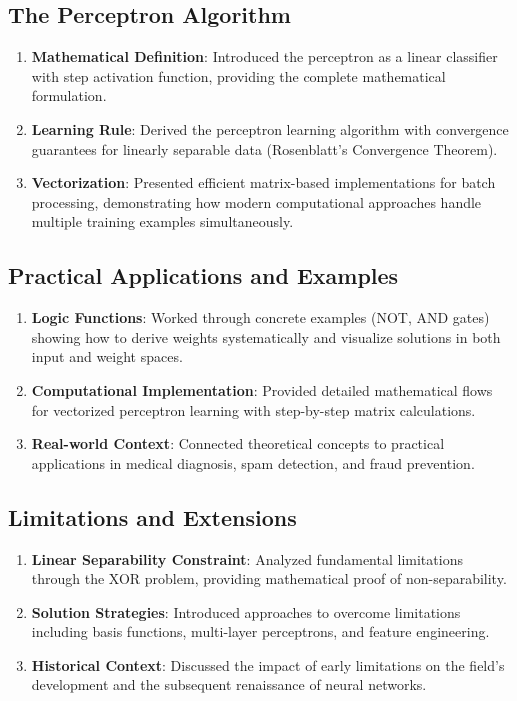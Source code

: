 \subsection{The Perceptron Algorithm}
\begin{enumerate}
    \item \textbf{Mathematical Definition}: Introduced the perceptron as a linear classifier with step activation function, providing the complete mathematical formulation.
    
    \item \textbf{Learning Rule}: Derived the perceptron learning algorithm with convergence guarantees for linearly separable data (Rosenblatt's Convergence Theorem).
    
    \item \textbf{Vectorization}: Presented efficient matrix-based implementations for batch processing, demonstrating how modern computational approaches handle multiple training examples simultaneously.
\end{enumerate}

\subsection{Practical Applications and Examples}
\begin{enumerate}
    \item \textbf{Logic Functions}: Worked through concrete examples (NOT, AND gates) showing how to derive weights systematically and visualize solutions in both input and weight spaces.
    
    \item \textbf{Computational Implementation}: Provided detailed mathematical flows for vectorized perceptron learning with step-by-step matrix calculations.
    
    \item \textbf{Real-world Context}: Connected theoretical concepts to practical applications in medical diagnosis, spam detection, and fraud prevention.
\end{enumerate}

\subsection{Limitations and Extensions}
\begin{enumerate}
    \item \textbf{Linear Separability Constraint}: Analyzed fundamental limitations through the XOR problem, providing mathematical proof of non-separability.
    
    \item \textbf{Solution Strategies}: Introduced approaches to overcome limitations including basis functions, multi-layer perceptrons, and feature engineering.
    
    \item \textbf{Historical Context}: Discussed the impact of early limitations on the field's development and the subsequent renaissance of neural networks.
\end{enumerate}

